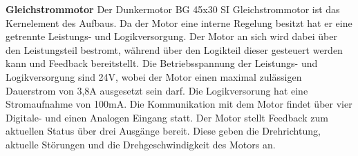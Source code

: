 \noindent\textbf{Gleichstrommotor}\newline
Der Dunkermotor BG 45x30 SI Gleichstrommotor ist das Kernelement des Aufbaus. Da der Motor eine interne Regelung besitzt hat er eine getrennte Leistungs- und Logikversorgung. Der Motor an sich wird dabei über den Leistungsteil bestromt, während über den Logikteil dieser gesteuert werden kann und Feedback bereitstellt. Die Betriebsspannung der Leistungs- und Logikversorgung sind 24V, wobei der Motor einen maximal zulässigen Dauerstrom von 3,8A ausgesetzt sein darf. Die Logikversorung hat eine Stromaufnahme von 100mA. Die Kommunikation mit dem Motor findet über vier Digitale- und einen Analogen Eingang statt. Der Motor stellt Feedback zum aktuellen Status über drei Ausgänge bereit. Diese geben die Drehrichtung, aktuelle Störungen und die Drehgeschwindigkeit des Motors an.\\
\begin{table}[H]
	\centering
	\caption{Eingänge und Funktionen des BG 45x30 SI}
	\label{tab:digitale_Eingaenge}
\end{table}

